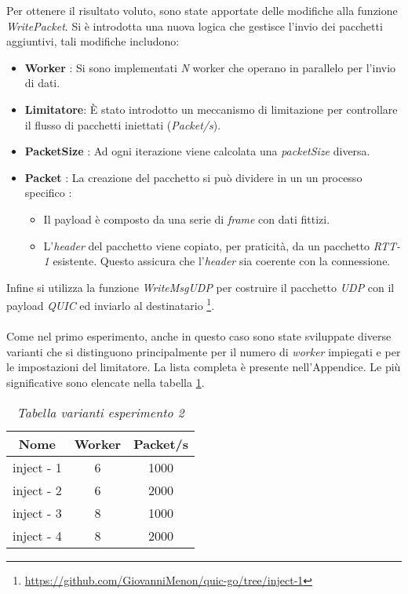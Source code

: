 Per ottenere il risultato voluto, sono state apportate delle modifiche alla funzione \emph{WritePacket}. Si è introdotta una nuova logica che gestisce l'invio dei pacchetti aggiuntivi, 
tali modifiche includono: 
\begin{itemize}
    \item \textbf{Worker} : Si sono implementati \emph{N} worker che operano in parallelo per l'invio di dati. 
    \item \textbf{Limitatore}: È stato introdotto un meccanismo di limitazione per controllare il flusso di pacchetti iniettati (\emph{Packet/s}). 
    \item \textbf{PacketSize} : Ad ogni iterazione viene calcolata una \emph{packetSize} diversa. 
    \item \textbf{Packet} : La creazione del pacchetto si può dividere in un un processo specifico :
    \begin{itemize}
        \item Il payload è composto da una serie di \emph{frame} con dati fittizi.
        \item L'\emph{header} del pacchetto viene copiato, per praticità, da un pacchetto \emph{RTT-1} esistente. Questo assicura che l'\emph{header} sia coerente con la connessione.
    \end{itemize}
\end{itemize}
\noindent Infine si utilizza la funzione \emph{WriteMsgUDP} per costruire il pacchetto \emph{UDP} con il payload \emph{QUIC} ed inviarlo al destinatario \footnote{\url{https://github.com/GiovanniMenon/quic-go/tree/inject-1}}.
\\\\
Come nel primo esperimento, anche in questo caso sono state sviluppate diverse varianti che si distinguono principalmente per il numero di \emph{worker} impiegati e per le impostazioni del limitatore.
La lista completa è presente nell'Appendice. Le più significative sono elencate nella tabella \ref{table-inject}.
\begin{table}[!h]
    \centering
    \begin{tabular}{|c|c|c|}
        \hline
        \textbf{Nome} & \textbf{Worker} & \textbf{Packet/s} \\
        \hline
        inject - 1  & 6 & 1000 \\
        \hline
        inject - 2 & 6 & 2000 \\
        \hline
        inject - 3 & 8 & 1000 \\
        \hline
        inject - 4 & 8 & 2000 \\
        \hline
    \end{tabular}
    \caption{\emph{Tabella varianti esperimento 2}}
    \label{table-inject}
\end{table}
